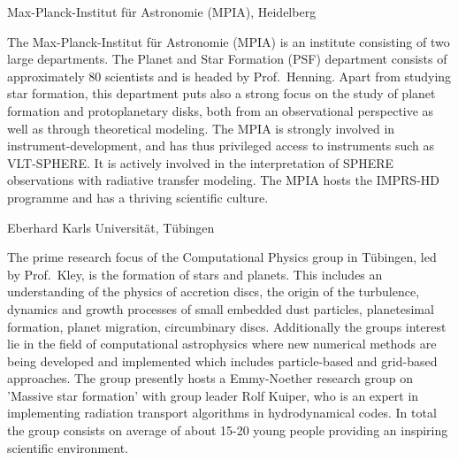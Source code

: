 \documentclass[10pt,fleqn,twoside]{article}
\begin{document}
\begin{Emphasize}
Max-Planck-Institut f\"ur Astronomie (MPIA), Heidelberg\\
\end{Emphasize}
The Max-Planck-Institut f\"ur Astronomie (MPIA) is an institute consisting
of two large departments. The Planet and Star Formation (PSF) department
consists of approximately 80 scientists and is headed by Prof.~Henning.
Apart from studying star formation, this department puts also a strong focus
on the study of planet formation and protoplanetary disks, both from an
observational perspective as well as through theoretical modeling.  The MPIA
is strongly involved in instrument-development, and has thus privileged
access to instruments such as VLT-SPHERE. It is actively involved in the
interpretation of SPHERE observations with radiative transfer modeling. The
MPIA hosts the IMPRS-HD programme and has a thriving scientific culture.
\vspace{1em}

\begin{Emphasize}
Eberhard Karls Universit\"at, T\"ubingen\\
\end{Emphasize}
The prime research focus of the Computational Physics group in T\"ubingen,
led by Prof.~Kley, is the
formation of stars and planets. This includes an understanding
of the physics of accretion discs, the origin of the turbulence, dynamics
and growth processes of small embedded dust particles, planetesimal formation,
planet migration, circumbinary discs. Additionally the groups interest lie in the
field of computational astrophysics where new numerical methods are being developed and
implemented which includes particle-based and grid-based approaches.
The group presently hosts a Emmy-Noether research group on 'Massive star formation'
with group leader Rolf Kuiper, who is an expert in implementing
radiation transport algorithms in hydrodynamical codes. In total the
group consists on average of about 15-20 young people providing an
inspiring scientific environment. 
\vspace{1em}
\end{document}
